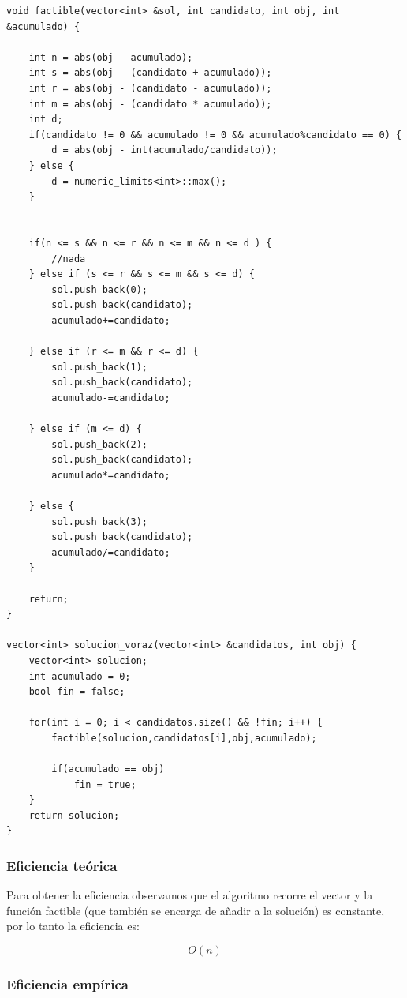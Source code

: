 \begin{lstlisting}
void factible(vector<int> &sol, int candidato, int obj, int &acumulado) {

    int n = abs(obj - acumulado);
    int s = abs(obj - (candidato + acumulado));
    int r = abs(obj - (candidato - acumulado));
    int m = abs(obj - (candidato * acumulado));
    int d;
    if(candidato != 0 && acumulado != 0 && acumulado%candidato == 0) {
        d = abs(obj - int(acumulado/candidato));
    } else {
        d = numeric_limits<int>::max();
    }


    if(n <= s && n <= r && n <= m && n <= d ) {
        //nada
    } else if (s <= r && s <= m && s <= d) {
        sol.push_back(0);
        sol.push_back(candidato);
        acumulado+=candidato;

    } else if (r <= m && r <= d) {
        sol.push_back(1);
        sol.push_back(candidato);
        acumulado-=candidato;

    } else if (m <= d) {
        sol.push_back(2);
        sol.push_back(candidato);
        acumulado*=candidato;

    } else {
        sol.push_back(3);
        sol.push_back(candidato);
        acumulado/=candidato;
    }

    return;
}

vector<int> solucion_voraz(vector<int> &candidatos, int obj) {
    vector<int> solucion;
    int acumulado = 0;
    bool fin = false;

    for(int i = 0; i < candidatos.size() && !fin; i++) {
        factible(solucion,candidatos[i],obj,acumulado);

        if(acumulado == obj)
            fin = true;
    }
    return solucion;
}
\end{lstlisting}

\subsubsection{Eficiencia teórica}

 Para obtener la eficiencia observamos que el algoritmo recorre el vector y la función factible (que también se encarga de añadir a la solución) es constante, por lo tanto la eficiencia es:
 
  \begin{equation}
      O(n)
  \end{equation}

 
\subsubsection{Eficiencia empírica}

